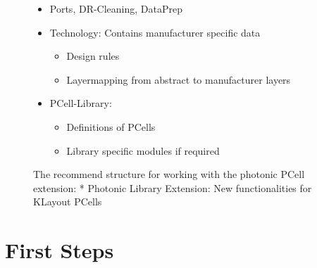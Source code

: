 \documentclass[a4paper,10pt,english]{sphinxmanual}
\begin{document}
\begin{figure}[htbp]
\centering
\capstart

\noindent{}
\caption{The recommend structure for working with the photonic PCell extension:
* Photonic Library Extension: New functionalities for KLayout PCells}\label{\detokenize{introduction:p-format}}
\begin{sphinxlegend}\begin{itemize}
\item {} 
Ports, DR-Cleaning, DataPrep

\end{itemize}
\begin{itemize}
\item {} 
Technology: Contains manufacturer specific data
\begin{itemize}
\item {} 
Design rules

\item {} 
Layermapping from abstract to manufacturer layers

\end{itemize}

\item {} 
PCell-Library:
\begin{itemize}
\item {} 
Definitions of PCells

\item {} 
Library specific modules if required

\end{itemize}

\end{itemize}
\end{sphinxlegend}
\end{figure}


\chapter{First Steps}
\label{\detokenize{photonics/first_steps:first-steps}}\label{\detokenize{photonics/first_steps::doc}}
\end{document}
